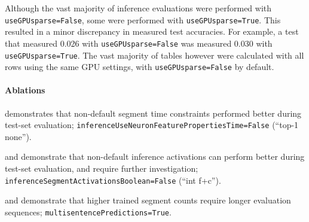 Although the vast majority of inference evaluations were performed with \texttt{useGPUsparse=False}, some were performed with \texttt{useGPUsparse=True}. This resulted in a minor discrepancy in measured test accuracies. For example, a test that measured 0.026 with \texttt{useGPUsparse=False} was measured 0.030 with \texttt{useGPUsparse=True}. The vast majority of tables however were calculated with all rows using the same GPU settings, with \texttt{useGPUsparse=False} by default.

\paragraph{Ablations}

 demonstrates that non-default segment time constraints performed better during test-set evaluation; \texttt{inferenceUseNeuronFeaturePropertiesTime=False} (``top-1 none''). 

 and  demonstrate that non-default inference activations can perform better during test-set evaluation, and require further investigation; \texttt{inferenceSegmentActivationsBoolean=False} (``int f+c''). 

 and  demonstrate that higher trained segment counts require longer evaluation sequences; \texttt{multisentencePredictions=True}.


